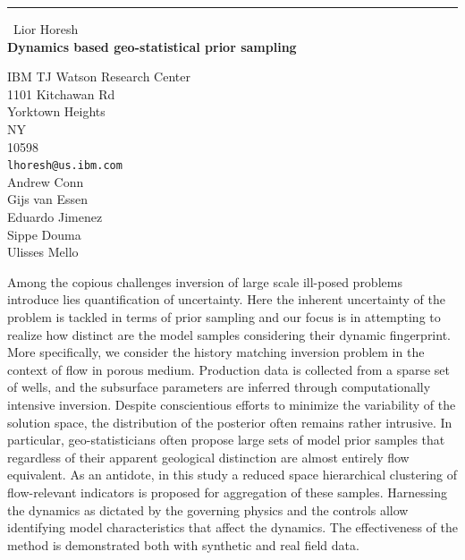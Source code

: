 \documentclass{report}
\begin{document}
\begin{center}
\rule{6in}{1pt} \
{\large Lior Horesh \\
{\bf Dynamics based geo-statistical prior sampling}}

IBM TJ Watson Research Center \\ 1101 Kitchawan Rd \\ Yorktown Heights \\ NY \\ 10598
\\
{\tt lhoresh@us.ibm.com}\\
Andrew Conn\\
Gijs van Essen\\
Eduardo Jimenez\\
Sippe Douma\\
Ulisses Mello\end{center}

Among the copious challenges inversion of large scale ill-posed problems
introduce lies quantification of uncertainty. Here the inherent
uncertainty of the problem is tackled in terms of prior sampling and our
focus is in attempting to realize how distinct are the model samples
considering their dynamic fingerprint. More specifically, we consider the
history matching inversion problem in the context of flow in porous
medium. Production data is collected from a sparse set of wells, and the
subsurface parameters are inferred through computationally intensive
inversion. Despite conscientious efforts to minimize the variability of
the solution space, the distribution of the posterior often remains
rather intrusive. In particular, geo-statisticians often propose large
sets of model prior samples that regardless of their apparent geological
distinction are almost entirely flow equivalent. As an antidote, in this
study a reduced space hierarchical clustering of flow-relevant indicators
is proposed for aggregation of these samples. Harnessing the dynamics as
dictated by the governing physics and the controls allow identifying
model characteristics that affect the dynamics. The effectiveness of the
method is demonstrated both with synthetic and real field data.
\end{document}
